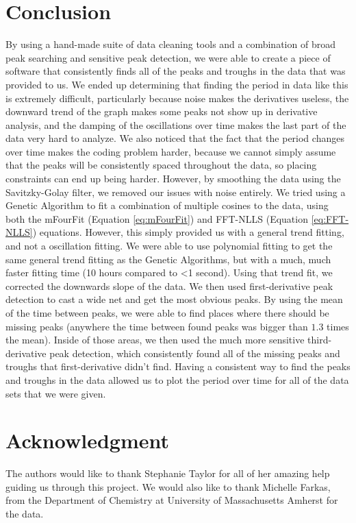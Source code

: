 \documentclass[conference]{IEEEtran}
\begin{document}
\section{Conclusion}
By using a hand-made suite of data cleaning tools and a combination of broad peak searching and sensitive peak detection, we were able to create a piece of software that consistently finds all of the peaks and troughs in the data that was provided to us. We ended up determining that finding the period in data like this is extremely difficult, particularly because noise makes the derivatives useless, the downward trend of the graph makes some peaks not show up in derivative analysis, and the damping of the oscillations over time makes the last part of the data very hard to analyze. We also noticed that the fact that the period changes over time makes the coding problem harder, because we cannot simply assume that the peaks will be consistently spaced throughout the data, so placing constraints can end up being harder.
However, by smoothing the data using the Savitzky-Golay filter, we removed our issues with noise entirely. We tried using a Genetic Algorithm to fit a combination of multiple cosines to the data, using both the mFourFit (Equation \ref{eq:mFourFit}) and FFT-NLLS (Equation \ref{eq:FFT-NLLS}) equations. However, this simply provided us with a general trend fitting, and not a oscillation fitting. We were able to use polynomial fitting to get the same general trend fitting as the Genetic Algorithms, but with a much, much faster fitting time (10 hours compared to <1 second). Using that trend fit, we corrected the downwards slope of the data. We then used first-derivative peak detection to cast a wide net and get the most obvious peaks. By using the mean of the time between peaks, we were able to find places where there should be missing peaks (anywhere the time between found peaks was bigger than $1.3$ times the mean). Inside of those areas, we then used the much more sensitive third-derivative peak detection, which consistently found all of the missing peaks and troughs that first-derivative didn’t find. Having a consistent way to find the peaks and troughs in the data allowed us to plot the period over time for all of the data sets that we were given.

\section*{Acknowledgment}


The authors would like to thank Stephanie Taylor for all of her amazing help guiding us through this project. We would also like to thank Michelle Farkas, from the Department of Chemistry at University of Massachusetts Amherst for the data.
\end{document}
